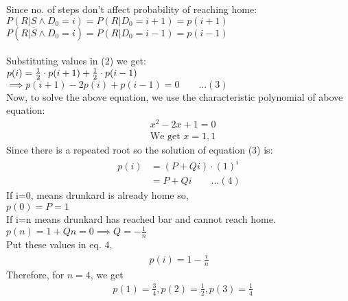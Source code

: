 \documentclass[12pt]{article}
\begin{document}
\begin{solution}
    Since no. of steps don't affect probability of reaching home:\\
        $P(R|S\wedge D_0 = i) = P(R|D_0 = i+1) = p(i+1)$\\
        $P(R|\overline{S}\wedge D_0 = i)=P(R|D_0 = i-1)=p(i-1)$\\\\
        Substituting values in (2) we get:\\
        $p(i)=\frac{1}{2} \cdot p(i+1) + \frac{1}{2} \cdot p(i-1)\\$
        $\implies p(i+1) - 2p(i) + p(i-1)=0\quad\quad...(3)$\\
    Now, to solve the above equation, we use the characteristic polynomial of above equation:
      \begin{align*}
          &x^2 - 2x + 1 = 0\\
          &\text{We get $x=1,1$}
      \end{align*}
      Since there is a repeated root so the solution of equation (3) is:\\
      \begin{align*}
        p(i) &= (P+Qi) \cdot (1)^i\\
        &= P + Qi\quad\quad...(4)
      \end{align*}
        If i=0, means drunkard is already home so,\\
        $p(0)= P = 1$\\
        If i=n means drunkard has reached bar and cannot reach home.\\
        $p(n) = 1+Qn =0  \implies Q=-\frac{1}{n}$ \\
      Put these values in eq. 4,
      \begin{align*}
          p(i) = 1-\frac{i}{n}
      \end{align*}        
      Therefore, for $n = 4$, we get
      \begin{align*}
        &p(1) = \frac{3}{4} ,p(2) = \frac{1}{2},p(3) = \frac{1}{4}
      \end{align*}\vspace{10pt}
      
      
  \end{solution}
\end{document}
